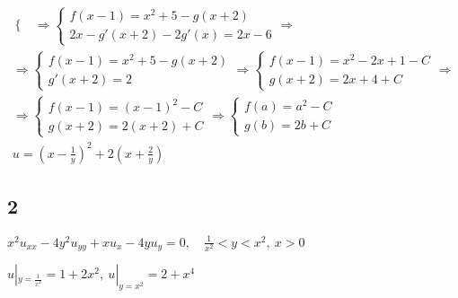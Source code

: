 \begin{enumerate}
\begin{gather*}
\begin{cases}
  \end{cases} \Rightarrow \begin{cases}
    f(x-1) = x^{2}+5-g(x+2) \\ 2x-g'(x+2)-2g'(x)=2x-6
  \end{cases} \Rightarrow \\ \Rightarrow \begin{cases}
  f(x-1) = x^{2}+5-g(x+2) \\ g'(x+2) = 2
  \end{cases} \Rightarrow \begin{cases}
    f(x-1) = x^{2} -2x + 1 - C \\ g(x+2) = 2x+4+C
  \end{cases} \Rightarrow \\ \Rightarrow \begin{cases}
    f(x-1)=(x-1)^{2}-C \\ g(x+2) = 2(x+2) +C
  \end{cases} \Rightarrow \begin{cases}
    f(a)=a^{2}-C \\ g(b) = 2b+C
  \end{cases} \\
  \boxed{u=(x- \frac{1}{y})^{2}+2(x+ \frac{2}{y})}
\end{gather*}
\end{enumerate}

\subsection{2}
$x^{2}u_{xx}-4y^{2}u_{yy}+xu_{x}-4yu_{y}=0, \quad \frac{1}{x^{2}}<y<x^{2}, \ x>0$ 

$u|_{y= \frac{1}{x^{2}}}= 1 +2x^{2}, \ u|_{y=x^{2}} = 2 + x^{4}$ 

